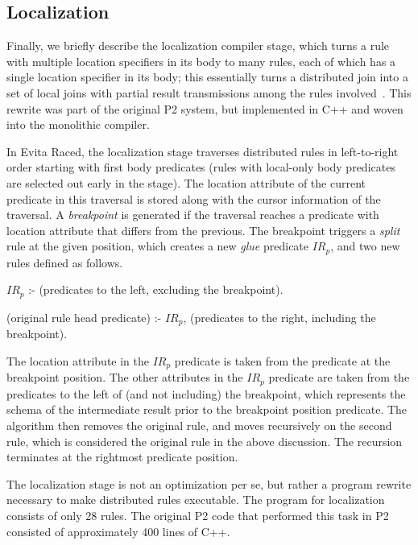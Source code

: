 {\subsection{Localization}
\label{ch:evita:sec:localization}

Finally, we briefly describe the localization compiler stage, which turns a
rule with multiple location specifiers in its body to many rules, each of which
has a single location specifier in its body; this essentially turns a
distributed join into a set of local joins with partial result transmissions
among the rules involved~\cite{loo-sigmod06}.  This rewrite was part of the original P2
system, but implemented in C++ and woven into the monolithic compiler.

In Evita Raced, the localization stage traverses distributed rules in
left-to-right order starting with first body predicates (rules with local-only
body predicates are selected out early in the stage).  The location attribute
of the current predicate in this traversal is stored along with the cursor
information of the traversal.  A {\em breakpoint} is generated if the traversal
reaches a predicate with location attribute that differs from the previous.
The breakpoint triggers a {\em split} rule at the given position, which creates
a new {\em glue} predicate $IR_p$, and two new rules defined as follows.
\begin{CompactEnumerate} 
\item $IR_p$ :- (predicates to the left, excluding the breakpoint).  
\item (original rule head predicate) :- $IR_p$, (predicates to the right, including
  the breakpoint).  
\end{CompactEnumerate} 
The location attribute in the $IR_p$ predicate is taken from the predicate at
the breakpoint position.  The other attributes in the $IR_p$ predicate are
taken from the predicates to the left of (and not including) the breakpoint,
which represents the schema of the intermediate result prior to the breakpoint
position predicate.  The algorithm then removes the original rule, and moves
recursively on the second rule, which is considered the original rule in the
above discussion.  The recursion terminates at the rightmost predicate
position.

The localization stage is not an optimization per se, but rather a program
rewrite necessary to make distributed rules executable.
The \OVERLOG program for localization consists of only 28 rules.  The original
P2 code that performed this task in P2 consisted of approximately 400 lines of
C++.

}
